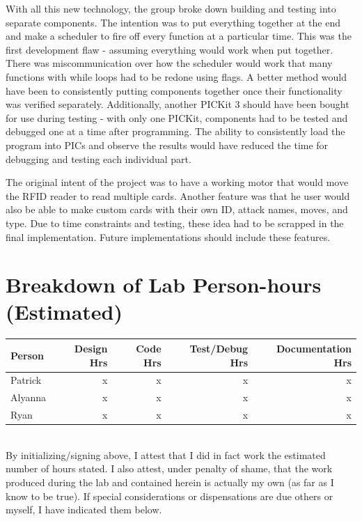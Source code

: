 \documentclass[12pt]{article} %
\begin{document}
\begin{itemize}
\begin{itemize}
\begin{itemize}
\begin{itemize}
\begin{itemize}
With all this new technology, the group broke down building and testing into separate components. The intention was to put everything
together at the end and make a scheduler to fire off every function at a particular time. This was the first development flaw - assuming
everything would work when put together. There was miscommunication over how the scheduler would work that many functions with while 
loops had to be redone using flags. A better method would have been to consistently putting components together once their functionality
was verified separately. Additionally, another PICKit 3 should have been bought for use during testing - with only one PICKit, components
had to be tested and debugged one at a time after programming. The ability to consistently load the program into PICs and observe the results
would have reduced the time for debugging and testing each individual part.

The original intent of the project was to have a working motor that would move the
RFID reader to read multiple cards. Another feature was that he user would also be able to make custom cards
with their own ID, attack names, moves, and type. Due to time constraints and testing, these idea had
to be scrapped in the final implementation. Future implementations should include these features.

\pagebreak
\appendix


\section{Breakdown of Lab Person-hours (Estimated)}
\begin{tabular}{|l|*{4}{r|}}
	\hline
	Person & Design Hrs & Code Hrs & Test/Debug Hrs & Documentation Hrs \\ \hline
	Patrick & x & x & x & x  \\ \hline
	Alyanna & x & x & x & x \\ \hline
	Ryan & x & x & x & x  \\ \hline
\end{tabular}

~\\

By initializing/signing above, I attest that I did in fact work the
estimated number of hours stated. I also attest, under penalty of shame,
that the work produced during the lab and contained herein is actually my
own (as far as I know to be true). If special considerations or
dispensations are due others or myself, I have indicated them below.


\end{itemize}
\end{itemize}
\end{itemize}
\end{itemize}
\end{itemize}
\end{document}
